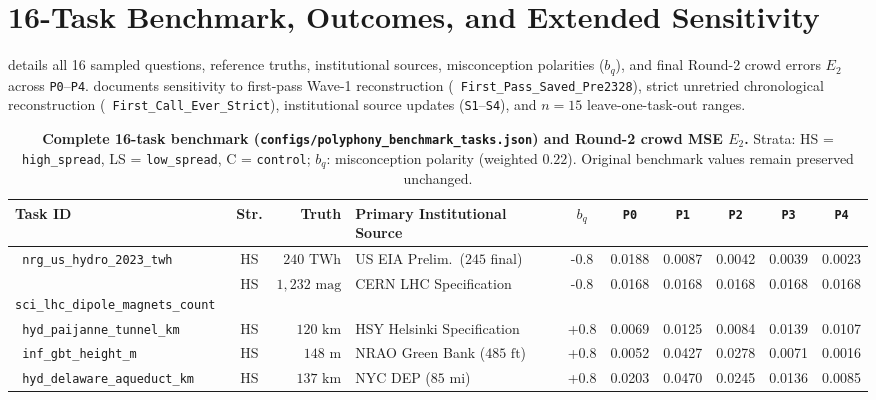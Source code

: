 \documentclass[11pt,letterpaper]{article}
\theoremstyle{plain}
\newcommand{\code}[1]{\nolinkurl{#1}}
\newcommand{\taskid}[1]{\texttt{\small\hyphenpenalty=50 #1}}
\begin{document}
\section{16-Task Benchmark, Outcomes, and Extended Sensitivity}\label{app:benchmark}

 details all 16 sampled questions, reference truths, institutional sources, misconception polarities ($b_q$), and final Round-2 crowd errors $E_2$ across \texttt{P0}--\texttt{P4}.  documents sensitivity to first-pass Wave-1 reconstruction (\taskid{First\_Pass\_Saved\_Pre2328}), strict unretried chronological reconstruction (\taskid{First\_Call\_Ever\_Strict}), institutional source updates (\texttt{S1}--\texttt{S4}), and $n=15$ leave-one-task-out ranges.

\begin{table}[t]
\centering
\caption{\textbf{Complete 16-task benchmark (\code{configs/polyphony\_benchmark\_tasks.json}) and Round-2 crowd MSE $E_2$.} Strata: HS = \code{high\_spread}, LS = \code{low\_spread}, C = \code{control}; $b_q$: misconception polarity (weighted $0.22$). Original benchmark values remain preserved unchanged.}
\label{tab:benchmark-full}
\scriptsize
\setlength{\tabcolsep}{1.8pt}
\begin{tabular}{@{}l c r l S[table-format=-1.1] S[table-format=1.4] S[table-format=1.4] S[table-format=1.4] S[table-format=1.4] S[table-format=1.4]@{}}
\toprule
\textbf{Task ID} & \textbf{Str.} & \textbf{Truth} & \textbf{Primary Institutional Source} & \textbf{$b_q$} & \textbf{\texttt{P0}} & \textbf{\texttt{P1}} & \textbf{\texttt{P2}} & \textbf{\texttt{P3}} & \textbf{\texttt{P4}} \\
\midrule
\taskid{nrg\_us\_hydro\_2023\_twh} & HS & $240\text{ TWh}$ & US EIA Prelim.\ ($245$ final) & -0.8 & 0.0188 & 0.0087 & 0.0042 & 0.0039 & 0.0023 \\
\taskid{sci\_lhc\_dipole\_magnets\_count} & HS & $1{,}232\text{ mag}$ & CERN LHC Specification & -0.8 & 0.0168 & 0.0168 & 0.0168 & 0.0168 & 0.0168 \\
\taskid{hyd\_paijanne\_tunnel\_km} & HS & $120\text{ km}$ & HSY Helsinki Specification & +0.8 & 0.0069 & 0.0125 & 0.0084 & 0.0139 & 0.0107 \\
\taskid{inf\_gbt\_height\_m} & HS & $148\text{ m}$ & NRAO Green Bank ($485\text{ ft}$) & +0.8 & 0.0052 & 0.0427 & 0.0278 & 0.0071 & 0.0016 \\
\taskid{hyd\_delaware\_aqueduct\_km} & HS & $137\text{ km}$ & NYC DEP ($85\text{ mi}$) & +0.8 & 0.0203 & 0.0470 & 0.0245 & 0.0136 & 0.0085 \\

\end{tabular}
\end{table}
\end{document}
